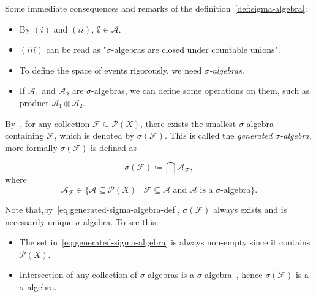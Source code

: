 \begin{notenl}
    Some immediate consequences and remarks of the definition~\ref{def:sigma-algebra}:
    \begin{itemize}
        \item By $(i)$ and $(ii)$, $\emptyset \in \mathcal{A}$.
        \item  $(iii)$ can be read as "$\sigma$-algebras are closed under countable unions".
        \item To define the space of events rigorously, we need \textit{$\sigma$-algebras}.
        \item If $\mathcal{A}_1$ and $\mathcal{A}_2$ are $\sigma$-algebras, we can define some operations on them, such as product $\mathcal{A}_1 \otimes \mathcal{A}_2$.
    \end{itemize}
\end{notenl}

By~\cite[Cor 1.1.3]{MeasureTheoryCohn}, for any collection $\mathcal{F} \subseteq \mathcal{P}(X)$, there exists the smallest $\sigma$-algebra containing $\mathcal{F}$, which is denoted by $\sigma(\mathcal{F})$. This is called the \emph{generated $\sigma$-algebra}, more formally $\sigma(\mathcal{F})$ is defined as

\begin{equation}
    \sigma(\mathcal{F}) \coloneq \bigcap \mathcal{A}_\mathcal{F},\label{eq:generated-sigma-algebra-def}
\end{equation}
where
\begin{equation}
    \mathcal{A}_{\mathcal{F}}
    \in \{\mathcal{A} \subseteq  \mathcal{P}(X) \mid \mathcal{F} \subseteq \mathcal{A} \text{ and } \mathcal{A} \text{ is a } \sigma\text{-algebra} \}.\label{eq:generated-sigma-algebra}
\end{equation}

\begin{remarknl}
    Note that,by~\ref{eq:generated-sigma-algebra-def}, $\sigma(\mathcal{F})$ always exists and is necessarily unique $\sigma$-algebra. To see this:
    \begin{itemize}
        \item The set in~\ref{eq:generated-sigma-algebra} is always non-empty since it contains $\mathcal{P}(X)$.
        \item Intersection of any collection of $\sigma$-algebras is a $\sigma$-algebra~\cite[Prop 1.1.2]{MeasureTheoryCohn}, hence $\sigma(\mathcal{F})$ is a $\sigma$-algebra.
    \end{itemize}
\end{remarknl}

